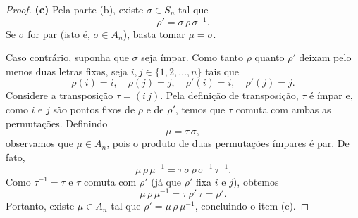 \documentclass[11pt,openany]{book}
\begin{document}
\begin{proof}
    \bigskip

    \textbf{(c)} Pela parte (b), existe $\sigma\in S_n$ tal que
    \[
    \rho'=\sigma\,\rho\,\sigma^{-1}.
    \]
    Se $\sigma$ for par (isto é, $\sigma\in A_n$), basta tomar $\mu=\sigma$.

    Caso contrário, suponha que $\sigma$ seja ímpar. Como tanto $\rho$ quanto $\rho'$ deixam pelo menos duas letras fixas, seja $i,j\in\{1,2,\dots,n\}$ tais que
    \[
    \rho(i)=i,\quad \rho(j)=j,\quad \rho'(i)=i,\quad \rho'(j)=j.
    \]
    Considere a transposição $\tau=(i\,j)$. Pela definição de transposição, $\tau$ é ímpar e, como $i$ e $j$ são pontos fixos de $\rho$ e de $\rho'$, temos que $\tau$ comuta com ambas as permutações. Definindo
    \[
    \mu=\tau\,\sigma,
    \]
    observamos que $\mu\in A_n$, pois o produto de duas permutações ímpares é par. De fato, 
    \[
    \mu\,\rho\,\mu^{-1} = \tau\,\sigma\,\rho\,\sigma^{-1}\,\tau^{-1}.
    \]
    Como $\tau^{-1}=\tau$ e $\tau$ comuta com $\rho'$ (já que $\rho'$ fixa $i$ e $j$), obtemos
    \[
    \mu\,\rho\,\mu^{-1} = \tau\,\rho'\,\tau = \rho'.
    \]
    Portanto, existe $\mu\in A_n$ tal que $\rho'=\mu\,\rho\,\mu^{-1}$, concluindo o item (c).
\end{proof}
\end{document}
